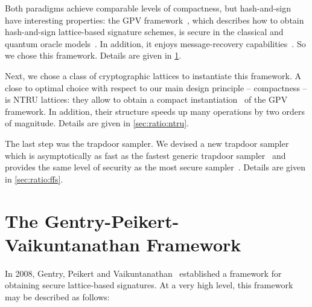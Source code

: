 \medskip

Both paradigms achieve comparable levels of compactness, but hash-and-sign have interesting properties: the GPV framework~\cite{STOC:GenPeiVai08}, which describes how to obtain hash-and-sign lattice-based signature schemes, is secure in the classical and quantum oracle models~\cite{STOC:GenPeiVai08,AC:BDFLSZ11}. In addition, it enjoys message-recovery capabilities~\cite{SCN:delLyuPoi16}. So we chose this framework. Details are given in \cref{sec:ratio:gpv}.

\medskip

Next, we chose a class of cryptographic lattices to instantiate this framework. A close to optimal choice with respect to our main design principle -- compactness -- is NTRU lattices: they allow to obtain a compact instantiation~\cite{AC:DucLyuPre14} of the GPV framework. In addition, their structure speeds up many operations by two orders of magnitude. Details are given in \cref{sec:ratio:ntru}.

\medskip

The last step was the trapdoor sampler. We devised a new trapdoor sampler which is asymptotically as fast as the fastest generic trapdoor sampler~\cite{C:Peikert10} and provides the same level of security as the most secure sampler~\cite{SODA:Klein00}. Details are given in \cref{sec:ratio:ffs}.


\section{The Gentry-Peikert-Vaikuntanathan Framework}\label{sec:ratio:gpv}

In 2008, Gentry, Peikert and Vaikuntanathan~\cite{STOC:GenPeiVai08} established a framework for obtaining secure lattice-based signatures. At a very high level, this framework may be described as follows:

